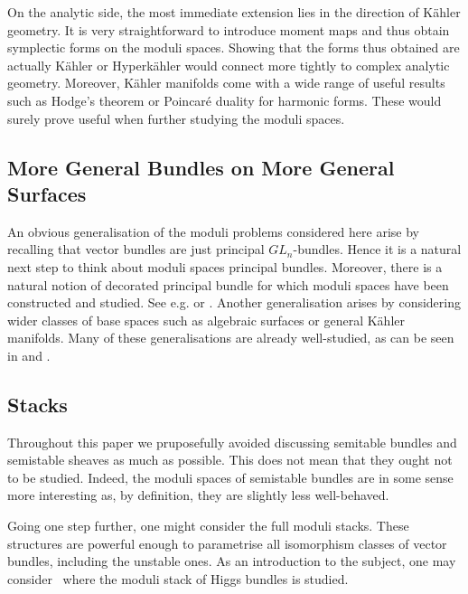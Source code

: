 \documentclass[12pt]{ociamthesis}  %
\begin{document}
On the analytic side, the most immediate extension lies in the
direction of K\"ahler geometry.
It is very straightforward to introduce moment maps and thus obtain
symplectic forms on the moduli spaces. Showing that the forms thus
obtained are actually K\"ahler or Hyperk\"ahler would connect more
tightly to complex analytic geometry. Moreover, K\"ahler manifolds
come with a wide range of useful results such as Hodge's theorem
or Poincar\'e duality for harmonic forms. These would surely prove
useful when further studying the moduli spaces.

\subsection{More General Bundles on More General Surfaces}

An obvious generalisation of the moduli problems considered here
arise by recalling that vector bundles are just principal
$GL_n$-bundles. Hence it is a natural next step to think about
moduli spaces principal bundles. Moreover, there is a natural
notion of decorated principal bundle for which moduli spaces have
been constructed and studied. See e.g.
\cite[Section 4.B]{huybrechts2010} or \cite{schmitt2004}.
Another generalisation arises by considering wider classes
of base spaces such as algebraic surfaces or general K\"ahler
manifolds. Many of these generalisations are already well-studied,
as can be seen in \cite{huybrechts2010} and \cite{kobayashi1987}.

\subsection{Stacks}

Throughout this paper we pruposefully avoided discussing semitable
bundles and semistable sheaves as much as possible. This does not
mean that they ought not to be studied. Indeed, the moduli spaces
of semistable bundles are in some sense more interesting as, by
definition, they are slightly less well-behaved.

Going one step further, one might consider the full moduli stacks.
These structures are powerful enough to parametrise
all isomorphism classes of vector bundles, including the unstable ones.
As an introduction to the subject, one may consider~\cite{cm2017} where the moduli stack of Higgs bundles is studied.

\pagebreak
\renewcommand{\bibname}{References}
\printbibliography
\end{document}
